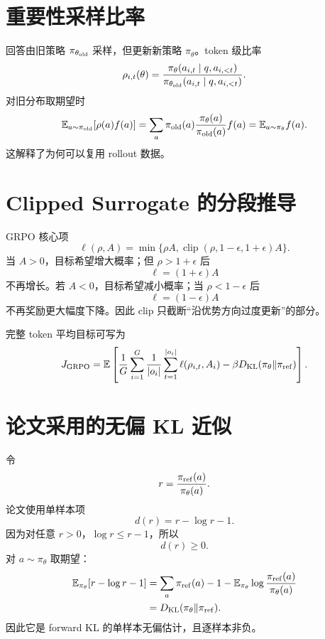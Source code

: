 \documentclass[UTF8,12pt,a4paper,fontset=none]{ctexart}
\numberwithin{equation}{section}
\newcommand{\E}{\mathbb{E}}
\newcommand{\KL}{D_{\mathrm{KL}}}
\begin{document}
\section{重要性采样比率}
回答由旧策略 $\pi_{\theta_{\rm old}}$ 采样，但更新新策略 $\pi_\theta$。token 级比率
\begin{equation}
 \rho_{i,t}(\theta)=
 \frac{\pi_\theta(a_{i,t}\mid q,a_{i,<t})}
 {\pi_{\theta_{\rm old}}(a_{i,t}\mid q,a_{i,<t})}.
\end{equation}
对旧分布取期望时
\begin{equation}
 \E_{a\sim\pi_{\rm old}}[\rho(a)f(a)]
 =\sum_a\pi_{\rm old}(a)\frac{\pi_\theta(a)}{\pi_{\rm old}(a)}f(a)
 =\E_{a\sim\pi_\theta}f(a).
\end{equation}
这解释了为何可以复用 rollout 数据。

\section{Clipped Surrogate 的分段推导}
GRPO 核心项
\begin{equation}
 \ell(\rho,A)=\min\{\rho A,\operatorname{clip}(\rho,1-\epsilon,1+\epsilon)A\}.
\end{equation}
当 $A>0$，目标希望增大概率；但 $\rho>1+\epsilon$ 后
\begin{equation}
 \ell=(1+\epsilon)A
\end{equation}
不再增长。若 $A<0$，目标希望减小概率；当 $\rho<1-\epsilon$ 后
\begin{equation}
 \ell=(1-\epsilon)A
\end{equation}
不再奖励更大幅度下降。因此 clip 只截断“沿优势方向过度更新”的部分。

完整 token 平均目标可写为
\begin{equation}
 J_{\rm GRPO}=\E\left[\frac1G\sum_{i=1}^{G}\frac1{|o_i|}
 \sum_{t=1}^{|o_i|}\ell(\rho_{i,t},A_i)-\beta\KL(\pi_\theta\Vert\pi_{\rm ref})\right].
\end{equation}

\section{论文采用的无偏 KL 近似}
令
\begin{equation}
 r=\frac{\pi_{\rm ref}(a)}{\pi_\theta(a)}.
\end{equation}
论文使用单样本项
\begin{equation}
 d(r)=r-\log r-1.
\end{equation}
因为对任意 $r>0$，$\log r\le r-1$，所以
\begin{equation}
 d(r)\ge0.
\end{equation}
对 $a\sim\pi_\theta$ 取期望：
\begin{align}
 \E_{\pi_\theta}[r-\log r-1]
 &=\sum_a\pi_{\rm ref}(a)-1-
 \E_{\pi_\theta}\log\frac{\pi_{\rm ref}(a)}{\pi_\theta(a)}\\
 &=\KL(\pi_\theta\Vert\pi_{\rm ref}).
\end{align}
因此它是 forward KL 的单样本无偏估计，且逐样本非负。
\end{document}

